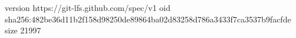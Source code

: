 version https://git-lfs.github.com/spec/v1
oid sha256:482be36d11b2f158d98250de89864ba02d83258d786a3433f7ca3537b9facfde
size 21997
